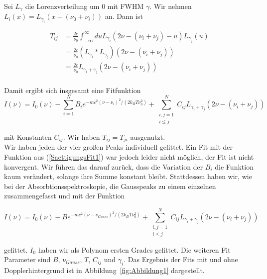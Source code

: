 \documentclass[a4paper,parskip]{scrartcl}
\begin{document}
Sei $L_\gamma$ die Lorenzverteilung um 0 mit FWHM $\gamma$. Wir nehmen $L_i(x) = L_{\gamma_i}(x-(\nu_0+\nu_i))$ an. Dann ist

\begin{align*}
T_{ij} &= \frac{2c}{\nu_0}\int_{-\infty}^\infty du L_{\gamma_i}(2\nu-(\nu_i+\nu_j)-u)L_{\gamma_j}(u)\\
&= \frac{2c}{\nu_0} (L_{\gamma_i} * L_{\gamma_j})(2\nu-(\nu_i+\nu_j)) \\
&= \frac{2c}{\nu_0} L_{\gamma_i+\gamma_j}(2\nu-(\nu_i+\nu_j)) \\
\end{align*}

Damit ergibt sich insgesamt eine Fitfunktion
\begin{equation}
I(\nu) = I_0(\nu)-\sum_{i=1}^N B_i e^{-mc^2(\nu-\nu_i)^2/(2k_BT\nu_0^2)} +\sum_{\substack{i,j=1\\i\leq j}}^N C_{ij} L_{\gamma_i+\gamma_j}(2\nu-(\nu_i+\nu_j))
\label{SaettigungsFit1}
\end{equation}


mit Konstanten $C_{ij}$. Wir haben $T_{ij}=T_{ji}$ ausgenutzt.\\

Wir haben jeden der vier großen Peaks individuell gefittet. Ein Fit mit der Funktion aus (\ref{SaettigungsFit1}) war jedoch leider nicht möglich, der Fit ist nicht konvergent. Wir führen das darauf zurück, dass die Variation der $B_i$ die Funktion kaum verändert, solange ihre Summe konstant bleibt. Stattdessen haben wir, wie bei der Absorbtionsspektroskopie, die Gausspeaks zu einem einzelnen zusammengefasst und mit der Funktion

 \begin{equation}
I(\nu) = I_0(\nu)-B e^{-mc^2(\nu-\nu_{Gauss})^2/(2k_BT\nu_0^2)} +\sum_{\substack{i,j=1\\i\leq j}}^N C_{ij} L_{\gamma_i+\gamma_j}(2\nu-(\nu_i+\nu_j))
\label{SaettigungsFit2}
\end{equation}

gefittet. $I_0$ haben wir als Polynom ersten Grades gefittet. Die weiteren Fit Parameter sind $B$, $\nu_{Gauss}$, $T$, $C_{ij}$ und $\gamma_i$. Das Ergebnis der Fits mit und ohne Dopplerhintergrund ist in Abbildung~\ref{fig:Abbildung1} dargestellt.
\end{document}
